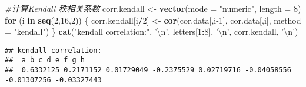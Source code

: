 \documentclass[
]{article}
\newenvironment{Shaded}{\begin{snugshade}}{\end{snugshade}}
\newcommand{\CharTok}[1]{\textcolor[rgb]{0.31,0.60,0.02}{#1}}
\newcommand{\CommentTok}[1]{\textcolor[rgb]{0.56,0.35,0.01}{\textit{#1}}}
\newcommand{\ControlFlowTok}[1]{\textcolor[rgb]{0.13,0.29,0.53}{\textbf{#1}}}
\newcommand{\DataTypeTok}[1]{\textcolor[rgb]{0.13,0.29,0.53}{#1}}
\newcommand{\DecValTok}[1]{\textcolor[rgb]{0.00,0.00,0.81}{#1}}
\newcommand{\KeywordTok}[1]{\textcolor[rgb]{0.13,0.29,0.53}{\textbf{#1}}}
\newcommand{\NormalTok}[1]{#1}
\newcommand{\OperatorTok}[1]{\textcolor[rgb]{0.81,0.36,0.00}{\textbf{#1}}}
\newcommand{\StringTok}[1]{\textcolor[rgb]{0.31,0.60,0.02}{#1}}
\begin{document}
\begin{Shaded}
\begin{Highlighting}[]
\CommentTok{#计算Kendall 秩相关系数}
\NormalTok{corr.kendall <-}\StringTok{ }\KeywordTok{vector}\NormalTok{(}\DataTypeTok{mode =} \StringTok{"numeric"}\NormalTok{, }\DataTypeTok{length =} \DecValTok{8}\NormalTok{)}
\ControlFlowTok{for}\NormalTok{ (i }\ControlFlowTok{in} \KeywordTok{seq}\NormalTok{(}\DecValTok{2}\NormalTok{,}\DecValTok{16}\NormalTok{,}\DecValTok{2}\NormalTok{)) \{}
\NormalTok{  corr.kendall[i}\OperatorTok{/}\DecValTok{2}\NormalTok{] <-}\StringTok{ }\KeywordTok{cor}\NormalTok{(cor.data[,i}\DecValTok{-1}\NormalTok{], cor.data[,i], }\DataTypeTok{method =} \StringTok{"kendall"}\NormalTok{)}
\NormalTok{\}}
\KeywordTok{cat}\NormalTok{(}\StringTok{"kendall correlation:"}\NormalTok{, }\StringTok{'}\CharTok{\textbackslash{}n}\StringTok{'}\NormalTok{, letters[}\DecValTok{1}\OperatorTok{:}\DecValTok{8}\NormalTok{], }\StringTok{'}\CharTok{\textbackslash{}n}\StringTok{'}\NormalTok{, corr.kendall, }\StringTok{'}\CharTok{\textbackslash{}n}\StringTok{'}\NormalTok{)}
\end{Highlighting}
\end{Shaded}

\begin{verbatim}
## kendall correlation: 
##  a b c d e f g h 
##  0.6332125 0.2171152 0.01729049 -0.2375529 0.02719716 -0.04058556 -0.01307256 -0.03327443
\end{verbatim}
\end{document}
